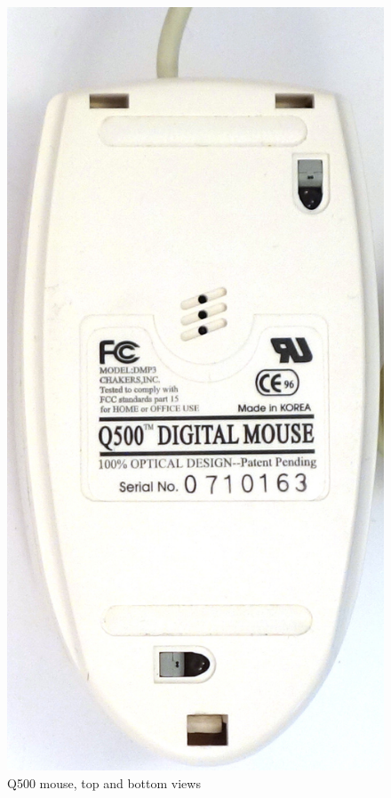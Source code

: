 \documentclass[11pt, a4paper]{article}
\begin{document}
\begin{figure}[h]
    \includegraphics[scale=0.5]{1996_q500_mouse/bottom_30.jpg}
    \caption{Q500 mouse, top and bottom views}
    \label{fig:q500mouseTopBottom}
\end{figure}
\end{document}
